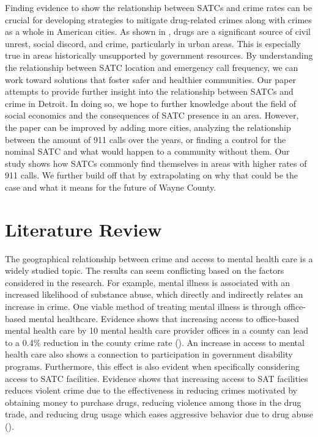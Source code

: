 \documentclass[12pt]{article}
\begin{document}
Finding evidence to show the relationship between SATCs and crime rates can be crucial for developing strategies to mitigate drug-related crimes along with crimes as a whole in American cities. As shown in \cite{SAT_centers_and_crime}, drugs are a significant source of civil unrest, social discord, and crime, particularly in urban areas. This is especially true in areas historically unsupported by government resources. By understanding the relationship between SATC location and emergency call frequency, we can work toward solutions that foster safer and healthier communities. Our paper attempts to provide further insight into the relationship between SATCs and crime in Detroit. In doing so, we hope to further knowledge about the field of social economics and the consequences of SATC presence in an area. However, the paper can be improved by adding more cities, analyzing the relationship between the amount of 911 calls over the years, or finding a control for the nominal SATC and what would happen to a community without them. Our study shows how SATCs commonly find themselves in areas with higher rates of 911 calls. We further build off that by extrapolating on why that could be the case and what it means for the future of Wayne County.



\section{Literature Review} \label{sec:literature}
The geographical relationship between crime and access to mental health care is a widely studied topic. The results can seem conflicting based on the factors considered in the research.  For example, mental illness is associated with an increased likelihood of substance abuse, which directly and indirectly relates an increase in crime. One viable method of treating mental illness is through office-based mental healthcare. Evidence shows that increasing access to office-based mental health care by 10 mental health care provider offices in a county can lead to a 0.4\% reduction in the county crime rate (\cite{mental_healthcare_and_crime}). An increase in access to mental health care also shows a connection to participation in government disability programs. Furthermore, this effect is also evident when specifically considering access to SATC facilities. Evidence shows that increasing access to SAT facilities reduces violent crime due to the effectiveness in reducing crimes motivated by obtaining money to purchase drugs, reducing violence among those in the drug trade, and reducing drug usage which eases aggressive behavior due to drug abuse (\cite{SAT_centers_and_crime}). 
\end{document}
